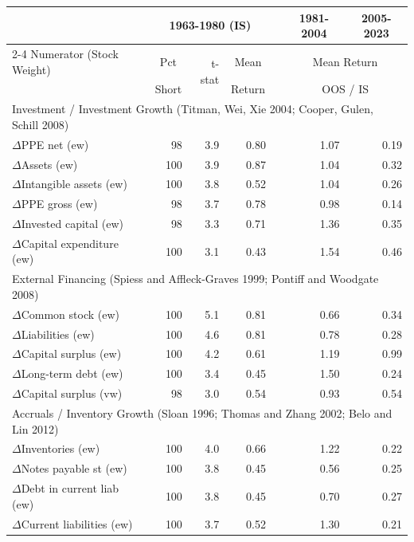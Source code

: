 
\begin{tabular}{lrrrlrr}
\toprule
 & \multicolumn{3}{c}{1963-1980 (IS)} &  & \multicolumn{1}{c}{1981-2004} & \multicolumn{1}{c}{2005-2023} \\ \cmidrule{2-4} \cmidrule{6-7}
Numerator (Stock Weight) & \multicolumn{1}{c}{Pct} & \multirow{2}{*}{t-stat} & \multicolumn{1}{c}{Mean} &  & \multicolumn{2}{c}{Mean Return} \\  
 & \multicolumn{1}{c}{Short} &  & \multicolumn{1}{c}{Return} &  & \multicolumn{2}{c}{OOS / IS} \\ 
\midrule
\multicolumn{7}{l}{Investment / Investment Growth (Titman, Wei, Xie 2004; Cooper, Gulen, Schill 2008)} \\ \hline
$\Delta$PPE net (ew) & 98 & 3.9 & 0.80 &  & 1.07 & 0.19\\
$\Delta$Assets (ew) & 100 & 3.9 & 0.87 &  & 1.04 & 0.32\\
$\Delta$Intangible assets (ew) & 100 & 3.8 & 0.52 &  & 1.04 & 0.26\\
$\Delta$PPE gross (ew) & 98 & 3.7 & 0.78 &  & 0.98 & 0.14\\
$\Delta$Invested capital (ew) & 98 & 3.3 & 0.71 &  & 1.36 & 0.35\\
$\Delta$Capital expenditure (ew) & 100 & 3.1 & 0.43 &  & 1.54 & 0.46 \bigstrut[b] \\ 
\multicolumn{7}{l}{External Financing (Spiess and Affleck-Graves 1999; Pontiff and Woodgate 2008)} \\ \hline
$\Delta$Common stock (ew) & 100 & 5.1 & 0.81 &  & 0.66 & 0.34\\
$\Delta$Liabilities (ew) & 100 & 4.6 & 0.81 &  & 0.78 & 0.28\\
$\Delta$Capital surplus (ew) & 100 & 4.2 & 0.61 &  & 1.19 & 0.99\\
$\Delta$Long-term debt (ew) & 100 & 3.4 & 0.45 &  & 1.50 & 0.24\\
$\Delta$Capital surplus (vw) & 98 & 3.0 & 0.54 &  & 0.93 & 0.54 \bigstrut[b] \\ 
\multicolumn{7}{l}{Accruals / Inventory Growth (Sloan 1996; Thomas and Zhang 2002; Belo and Lin 2012)} \\ \hline
$\Delta$Inventories (ew) & 100 & 4.0 & 0.66 &  & 1.22 & 0.22\\
$\Delta$Notes payable st (ew) & 100 & 3.8 & 0.45 &  & 0.56 & 0.25\\
$\Delta$Debt in current liab (ew) & 100 & 3.8 & 0.45 &  & 0.70 & 0.27\\
$\Delta$Current liabilities (ew) & 100 & 3.7 & 0.52 &  & 1.30 & 0.21\\

\end{tabular}

